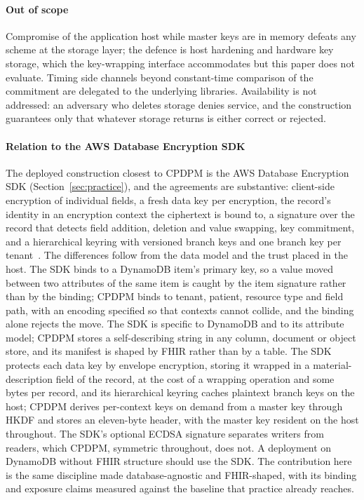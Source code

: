 \paragraph{Out of scope}
Compromise of the application host while master keys are in memory defeats any scheme at the storage layer; the defence is host hardening and hardware key storage, which the key-wrapping interface accommodates but this paper does not evaluate. Timing side channels beyond constant-time comparison of the commitment are delegated to the underlying libraries. Availability is not addressed: an adversary who deletes storage denies service, and the construction guarantees only that whatever storage returns is either correct or rejected.

\paragraph{Relation to the AWS Database Encryption SDK}
The deployed construction closest to CPDPM is the AWS Database Encryption SDK (Section~\ref{sec:practice}), and the agreements are substantive: client-side encryption of individual fields, a fresh data key per encryption, the record's identity in an encryption context the ciphertext is bound to, a signature over the record that detects field addition, deletion and value swapping, key commitment, and a hierarchical keyring with versioned branch keys and one branch key per tenant~\cite{aws-dbesdk-concepts,aws-dbesdk-hierarchical}. The differences follow from the data model and the trust placed in the host. The SDK binds to a DynamoDB item's primary key, so a value moved between two attributes of the same item is caught by the item signature rather than by the binding; CPDPM binds to tenant, patient, resource type and field path, with an encoding specified so that contexts cannot collide, and the binding alone rejects the move. The SDK is specific to DynamoDB and to its attribute model; CPDPM stores a self-describing string in any column, document or object store, and its manifest is shaped by FHIR rather than by a table. The SDK protects each data key by envelope encryption, storing it wrapped in a material-description field of the record, at the cost of a wrapping operation and some bytes per record, and its hierarchical keyring caches plaintext branch keys on the host; CPDPM derives per-context keys on demand from a master key through HKDF and stores an eleven-byte header, with the master key resident on the host throughout. The SDK's optional ECDSA signature separates writers from readers, which CPDPM, symmetric throughout, does not. A deployment on DynamoDB without FHIR structure should use the SDK. The contribution here is the same discipline made database-agnostic and FHIR-shaped, with its binding and exposure claims measured against the baseline that practice already reaches.

